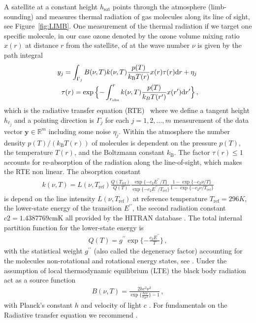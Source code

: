 A satellite at a constant height $h_{\text{sat}}$ points through the atmosphere (limb-sounding) and measures thermal radiation of gas molecules along its line of sight, see  Figure~\ref{fig:LIMB}.
One measurement of the thermal radiation if we target one specific molecule, in our case ozone denoted by the ozone volume mixing ratio $x(r)$ at distance $r$ from the satellite, of at the wave number $\nu$ is given by the path integral
\begin{align}
	\label{eq:RTE} 
	y_j =   \int_{\Gamma_j}  B(\nu,T) k(\nu, T)   \frac{p(T)}{k_{\text{B}} T(r)}  x(r)  \tau(r) \text{d}r + \eta_j \, \\
	\tau(r) = \exp{ \Bigl\{ - \int^{r}_{r_\text{obs}}  k(\nu, T)   \frac{p(T)}{k_B T(r^{\prime})}  x(r^{\prime}) \text{d}r^{\prime} \Bigr\} } \, ,\label{eq:absRTE} 
\end{align}
which is the radiative transfer equation (RTE)~\cite{mipas2000handbook} where we define a tangent height $h_{\ell_j}$ and a pointing direction is $\Gamma_j$ for each $j=1,2,\ldots,m$ measurement of the data vector $\bm{y} \in \mathbb{R}^m$ including some noise $\eta_j$.
Within the atmosphere the number density $p(T) / (k_{\text{B}} T(r))$ of molecules is dependent on the pressure $p(T)$, the temperature $T(r)$, and the Boltzmann constant $k_{\text{B}}$.
The factor $\tau(r)\leq 1$ accounts for re-absorption of the radiation along the line-of-sight, which makes the RTE non linear.
The absorption constant
\begin{align}
	k(\nu, T) = L(\nu, T_{\text{ref}}) \frac{Q(T_{\text{ref}})}{Q(T)} \frac{ \exp{\{ - c_2 E^{\prime \prime} / T\}} }{\exp{\{ - c_2 E^{\prime \prime} / T_{\text{ref}} \}}} \frac{ 1- \exp{\{ - c_2 \nu  / T \}} }{1 - \exp{\{ - c_2 \nu / T_{\text{ref}} \}}}
\end{align}
is depend on the line intensity $L(\nu, T_{\text{ref}})$ at reference temperature $T_{\text{ref}} =296K $, the lower-state energy of the transition $ E^{\prime \prime} $, the second radiation constant $c2=1.4387769\text{cmK}$ all provided by the HITRAN database \cite{gordon2022hitran2020}.
The total internal partition function for the lower-state energy is
\begin{align}
	Q(T )= g^{\prime \prime} \exp{\{ - \frac{ c_2 E^{\prime \prime} }{T}\}} \, ,
\end{align}
with the statistical weight $ g^{\prime \prime}$ (also called the degeneracy factor) accounting for the molecules non-rotational and rotational energy states, see \cite{vsimevckova2006einstein}.
Under the assumption of local thermodynamic equilibrium (LTE) the black body radiation act as a source function
\begin{align}
	B(\nu,T)   = \frac{2 h c^2 \nu^3}{\exp{\{\frac{hc\nu}{k_B T}\}}-1}\, ,
\end{align}
with Planck's constant $h$ and velocity of light $c$ \cite{}.
For fundamentals on the Radiative transfer equation we recommend \cite[Chapter 1]{rybicki2000rte}.

